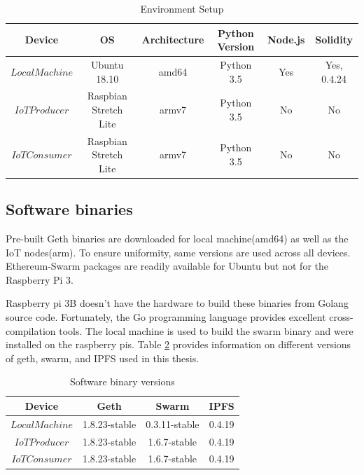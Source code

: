 \documentclass[11pt,openright]{report}
\begin{document}
\begin{table}[!htbp]
	\renewcommand{\arraystretch}{1}
	\caption{Environment Setup}
	\label{environment_setup}
	\centering
	\begin{tabular}{|c|c|c|c|c|c|}
		\hline
		\bfseries Device & \bfseries OS & \bfseries Architecture & \bfseries Python Version & \bfseries Node.js & \bfseries Solidity\\
		\hline\hline
		$Local Machine$ & Ubuntu 18.10 & amd64 & Python 3.5 &  Yes & Yes, 0.4.24\\ \hline
		$IoT Producer$ & Raspbian Stretch Lite & armv7 & Python 3.5 &  No & No\\ \hline
		$IoT Consumer$ & Raspbian Stretch Lite & armv7 & Python 3.5 &  No & No\\ \hline
	\end{tabular}
\end{table}

\subsection{Software binaries}
Pre-built Geth binaries are downloaded for local machine(amd64) as well as the IoT nodes(arm). To ensure uniformity, same versions are used across all devices. Ethereum-Swarm packages are readily available for Ubuntu but not for the Raspberry Pi 3.

Raspberry pi 3B doesn't have the hardware to build these binaries from Golang source code. Fortunately, the Go programming language provides excellent cross-compilation tools. The local machine is used to build the swarm binary and were installed on the raspberry pis. Table \ref{software_version} provides information on different versions of geth, swarm, and IPFS used in this thesis.

\begin{table}[!htbp]
	\renewcommand{\arraystretch}{1}
	\caption{Software binary versions}
	\label{software_version}
	\centering
	\begin{tabular}{|c|c|c|c|}
		\hline
		\bfseries Device & \bfseries Geth & \bfseries Swarm  & \bfseries IPFS\\
		\hline\hline
		$Local Machine$ & 1.8.23-stable & 0.3.11-stable & 0.4.19 \\ \hline
		$IoT Producer$ & 1.8.23-stable & 1.6.7-stable & 0.4.19 \\ \hline
		$IoT Consumer$ & 1.8.23-stable & 1.6.7-stable & 0.4.19 \\ \hline
	\end{tabular}
\end{table}
\end{document}
